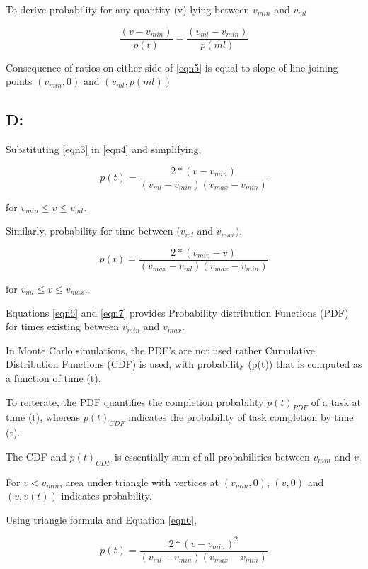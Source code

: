 To derive probability for any quantity (v) lying between $ v_{min} $ and $ v_{ml} $ 

\begin{equation}
\frac{(v - v_{min})}{ p(t) }  = \frac{(v_{ml} - v_{min})}{ p(ml) } 
\label{eqn5}
\end{equation}

Consequence of ratios on either side of \ref{eqn5} is equal to slope of line joining points $(v_{min}, 0)$ and $( v_{ml}, p(ml) )$


\subsection{D: }
Substituting \ref{eqn3} in \ref{eqn4} and simplifying,

\begin{equation}
p(t)  = \frac{2* (v - v_{min})}{ (v_{ml} - v_{min}) (v_{max} - v_{min}) } 
\label{eqn6}
\end{equation}

for $ v_{min} \leqslant v \leqslant v_{ml}$.

Similarly, probability for time between $(v_{ml}$ and $ v_{max})$,

\begin{equation}
p(t)  = \frac{2* (v_{min} - v)}{ (v_{max} - v_{ml}) (v_{max} - v_{min}) } 
\label{eqn7}
\end{equation}

for $ v_{ml} \leqslant v \leqslant v_{max}$.

Equations \ref{eqn6} and \ref{eqn7} provides Probability distribution Functions (PDF) for times existing between $v_{min}$ and $v_{max}$. 


In Monte Carlo simulations, the PDF's are not used rather Cumulative Distribution Functions (CDF) is used, with probability (p(t)) that is computed as a function of time (t).

To reiterate, the PDF quantifies the completion probability $p(t)_{PDF}$ of a task at time (t), whereas $p(t)_{CDF}$ indicates the probability of task completion by time (t).

The CDF and $p(t)_{CDF}$ is essentially sum of all probabilities between $v_{min}$ and $v$. 


For $ v < v_{min}$, area under triangle with vertices at $(v_{min}, 0)$, $(v, 0)$ and $(v, v(t))$ indicates probability.

Using triangle formula and Equation \ref{eqn6}, 

\begin{equation}
p(t)  = \frac{2* (v - v_{min})^{2}}{ (v_{ml} - v_{min}) (v_{max} - v_{min}) } 
\label{eqn8}
\end{equation}

